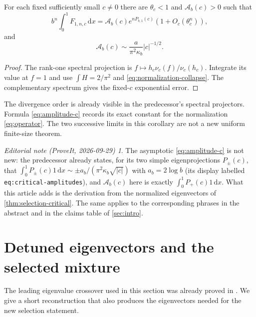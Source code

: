 \documentclass[11pt,a4paper]{article}
\numberwithin{equation}{section}
\theoremstyle{definition}
\theoremstyle{remark}
\newtheorem*{ednote}{Editorial note (ProveIt, 2026-09-29)}
\newcommand{\dd}{\,\mathrm d}
\begin{document}
\begin{corollary}
\label{cor:amplitude}
For each fixed sufficiently small $c\ne0$ there are $\theta_c<1$ and
$\mathcal A_b(c)>0$ such that
\begin{equation}
 b^n\int_0^1F_{1,n,c}\dd x
 =\mathcal A_b(c)e^{nP_{b,1}(c)}(1+O_c(\theta_c^n)),
 \label{eq:amplitude-n}
\end{equation}
and
\begin{equation}
 \mathcal A_b(c)\sim\frac{a}{\pi^2\kappa_b}|c|^{-1/2}.
 \label{eq:amplitude-c}
\end{equation}
\end{corollary}
\begin{proof}
The rank-one spectral projection is
$f\mapsto h_c\nu_c(f)/\nu_c(h_c)$.
Integrate its value at $f=1$ and use
$\int H=2/\pi^2$ and \cref{eq:normalization-collapse}.
The complementary spectrum gives the fixed-$c$ exponential error.
\end{proof}
The divergence order is already visible in the predecessor's spectral
projectors. Formula \cref{eq:amplitude-c} records its exact constant for
the normalization \cref{eq:operator}. The two successive limits in this
corollary are not a new uniform finite-size theorem.
\begin{ednote}
The asymptotic \cref{eq:amplitude-c} is not new: the predecessor
\cite{CriticalRepo} already states, for its two simple eigenprojections
$P_\pm(c)$, that
$\int_0^1P_\pm(c)1\dd x\sim\pm a_b/(\pi^2\kappa_b\sqrt{|c|})$ with
$a_b=2\log b$ (its display labelled \texttt{eq:critical-amplitudes}), and
$\mathcal A_b(c)$ here is exactly $\int_0^1P_+(c)1\dd x$. What this article
adds is the derivation from the normalized eigenvectors of
\cref{thm:selection-critical}. The same applies to the corresponding
phrases in the abstract and in the claims table of \cref{sec:intro}.
\end{ednote}

\section{Detuned eigenvectors and the selected mixture}
\label{sec:detuning}
The leading eigenvalue crossover used in this section was already proved
in \cite{CriticalRepo}. We give a short reconstruction that also produces
the eigenvectors needed for the new selection statement.
\end{document}
